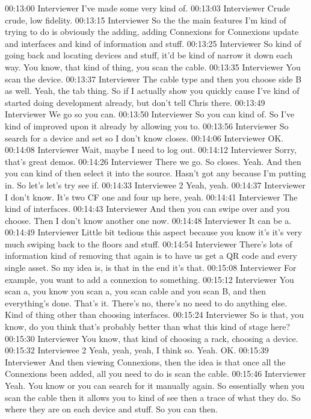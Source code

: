 00:13:00 Interviewer
I've made some very kind of.
00:13:03 Interviewer
Crude crude, low fidelity.
00:13:15 Interviewer
So the the main features I'm kind of trying to do is obviously the adding, adding Connexions for Connexions update and interfaces and kind of information and stuff.
00:13:25 Interviewer
So kind of going back and locating devices and stuff, it'd be kind of narrow it down each way. You know, that kind of thing, you scan the cable.
00:13:35 Interviewer
You scan the device.
00:13:37 Interviewer
The cable type and then you choose side B as well. Yeah, the tab thing. So if I actually show you quickly cause I've kind of started doing development already, but don't tell Chris there.
00:13:49 Interviewer
We go so you can.
00:13:50 Interviewer
So you can kind of. So I've kind of improved upon it already by allowing you to.
00:13:56 Interviewer
So search for a device and set so I don't know closes.
00:14:06 Interviewer
OK.
00:14:08 Interviewer
Wait, maybe I need to log out.
00:14:12 Interviewer
Sorry, that's great demos.
00:14:26 Interviewer
There we go. So closes. Yeah. And then you can kind of then select it into the source. Hasn't got any because I'm putting in. So let's let's try see if.
00:14:33 Interviewee 2 
Yeah, yeah.
00:14:37 Interviewer
I don't know. It's two CF one and four up here, yeah.
00:14:41 Interviewer
The kind of interfaces.
00:14:43 Interviewer
And then you can swipe over and you choose. Then I don't know another one now.
00:14:48 Interviewer
It can be a.
00:14:49 Interviewer
Little bit tedious this aspect because you know it's it's very much swiping back to the floors and stuff.
00:14:54 Interviewer
There's lots of information kind of removing that again is to have us get a QR code and every single asset. So my idea is, is that in the end it's that.
00:15:08 Interviewer
For example, you want to add a connexion to something.
00:15:12 Interviewer
You scan a, you know you scan a, you scan cable and you scan B, and then everything's done. That's it. There's no, there's no need to do anything else. Kind of thing other than choosing interfaces.
00:15:24 Interviewer
So is that, you know, do you think that's probably better than what this kind of stage here?
00:15:30 Interviewer
You know, that kind of choosing a rack, choosing a device.
00:15:32 Interviewee 2 
Yeah, yeah, yeah, I think so. Yeah. OK.
00:15:39 Interviewer
And then viewing Connexions, then the idea is that once all the Connexions been added, all you need to do is scan the cable.
00:15:46 Interviewer
Yeah. You know or you can search for it manually again. So essentially when you scan the cable then it allows you to kind of see then a trace of what they do. So where they are on each device and stuff. So you can then.
